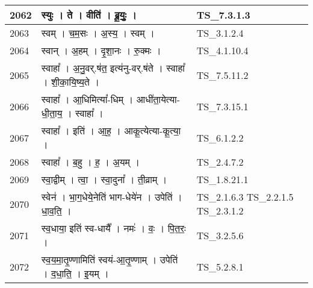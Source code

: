 \documentclass[17pt]{extarticle}
\begin{document}
\begin{longtable}{||p{0.4in}||p{4.9in}||p{0.9in}||}
    \hline
        
    2062 & स्युः   ।   ते   ।   वीति॑   ।   ब्रू॒युः॒   ।    & TS\_7.3.1.3       \\
    
    \hline
        
    2063 & स्वम्   ।   च॒म॒सः   ।   अ॒स्य॒   ।   स्वम्   ।    & TS\_3.1.2.4       \\
    
    \hline
        
    2064 & स्वान्   ।   अ॒हम्   ।   दृ॒शा॒नः   ।   रु॒क्मः   ।    & TS\_4.1.10.4       \\
    
    \hline
        
    2065 & स्वाहा᳚   ।   अ॒नु॒वर्.ष॑त॒ इत्य॑नु{-}वर्.ष॑ते   ।   स्वाहा᳚   ।   शी॒का॒यि॒ष्य॒ते   ।    & TS\_7.5.11.2       \\
    
    \hline
        
    2066 & स्वाहा᳚   ।   आ॒धिमित्या᳚{-}धिम्   ।   आधी॑ता॒येत्या{-}धी॒ता॒य॒   ।   स्वाहा᳚   ।    & TS\_7.3.15.1       \\
    
    \hline
        
    2067 & स्वाहा᳚   ।   इति॑   ।   आ॒ह॒   ।   आकू॒त्येत्या{-}कू॒त्या॒   ।    & TS\_6.1.2.2       \\
    
    \hline
        
    2068 & स्वाहा᳚   ।   ब॒हु   ।   ह॒   ।   अ॒यम्   ।    & TS\_2.4.7.2       \\
    
    \hline
        
    2069 & स्वा॒द्वीम्   ।   त्वा॒   ।   स्वा॒दुना᳚   ।   ती॒व्राम्   ।    & TS\_1.8.21.1       \\
    
    \hline
        
    2070 & स्वेन॑   ।   भा॒ग॒धेये॒नेति॑ भाग{-}धेये॑न   ।   उपेति॑   ।   धा॒व॒ति॒   ।    & TS\_2.1.6.3 TS\_2.2.1.5 TS\_2.3.1.2       \\
    
    \hline
        
    2071 & स्व॒धाया॒ इति॑ स्व{-}धायै᳚   ।   नमः॑   ।   वः॒   ।   पि॒त॒रः॒   ।    & TS\_3.2.5.6       \\
    
    \hline
        
    2072 & स्व॒य॒मा॒तृ॒ण्णामिति॑ स्वयं{-}आ॒तृ॒ण्णाम्   ।   उपेति॑   ।   द॒धा॒ति॒   ।   इ॒यम्   ।    & TS\_5.2.8.1       \\
    

\end{longtable}
\end{document}
